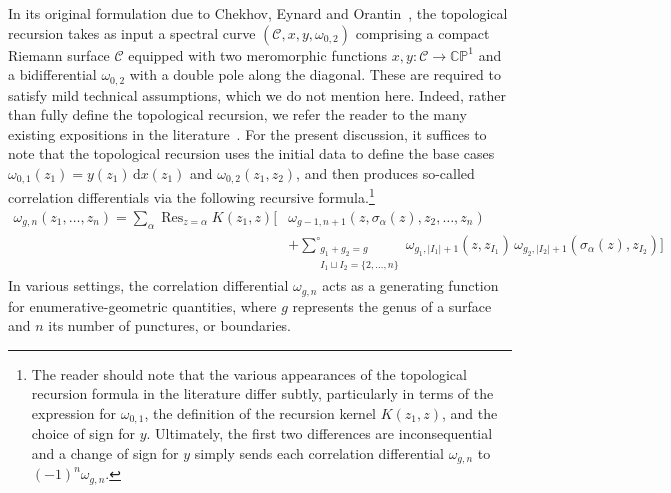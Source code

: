 \documentclass[a4paper]{article}
\theoremstyle{plain}
\numberwithin{theorem}{section}
\theoremstyle{definition}
\theoremstyle{remark}
\newcommand{\dd}{\mathrm{d}}
\begin{document}
In its original formulation due to Chekhov, Eynard and Orantin~\cite{che-eyn06, eyn-ora07}, the topological recursion takes as input a spectral curve $(\mathcal{C}, x, y, \omega_{0,2})$ comprising a compact Riemann surface $\mathcal{C}$ equipped with two meromorphic functions $x, y: \mathcal{C} \to \mathbb{CP}^1$ and a bidifferential $\omega_{0,2}$ with a double pole along the diagonal. These are required to satisfy mild technical assumptions, which we do not mention here. Indeed, rather than fully define the topological recursion, we refer the reader to the many existing expositions in the literature~\cite{do-dye-mat17, eyn-ora09}. For the present discussion, it suffices to note that the topological recursion uses the initial data to define the base cases $\omega_{0,1}(z_1) = y(z_1) \, \dd x(z_1)$ and $\omega_{0,2}(z_1, z_2)$, and then produces so-called correlation differentials via the following recursive formula.\footnote{The reader should note that the various appearances of the topological recursion formula in the literature differ subtly, particularly in terms of the expression for $\omega_{0,1}$, the definition of the recursion kernel $K(z_1, z)$, and the choice of sign for $y$. Ultimately, the first two differences are inconsequential and a change of sign for $y$ simply sends each correlation differential $\omega_{g,n}$ to $(-1)^n \omega_{g,n}$.}
\begin{align*}
\omega_{g,n}(z_1, \ldots, z_n) = \sum_{\alpha} \mathop{\mathrm{Res}}_{z = \alpha} K(z_1, z) \Bigg[ &\omega_{g-1,n+1}(z, \sigma_\alpha(z), z_2, \ldots, z_n) \\
&+ \sum_{\substack{g_1+g_2=g \\ I_1 \sqcup I_2 = \{2, \ldots, n\}}}^\circ \omega_{g_1,|I_1|+1}(z, z_{I_1}) \, \omega_{g_2,|I_2|+1}(\sigma_\alpha(z), z_{I_2}) \Bigg]
\end{align*}
In various settings, the correlation differential $\omega_{g,n}$ acts as a generating function for enumerative-geometric quantities, where $g$ represents the genus of a surface and $n$ its number of punctures, or boundaries.
\end{document}
